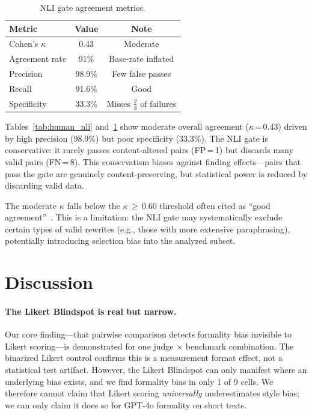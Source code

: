 \documentclass[11pt,a4paper]{article}
\begin{document}
\begin{table}[t]
\centering
\small
\caption{NLI gate agreement metrics.}
\label{tab:nli_metrics}
\begin{tabular}{lcc}
\toprule
\textbf{Metric} & \textbf{Value} & \textbf{Note} \\
\midrule
Cohen's $\kappa$ & 0.43 & Moderate \\
Agreement rate & 91\% & Base-rate inflated \\
Precision & 98.9\% & Few false passes \\
Recall & 91.6\% & Good \\
Specificity & 33.3\% & Misses $\frac{2}{3}$ of failures \\
\bottomrule
\end{tabular}
\end{table}

Tables~\ref{tab:human_nli} and~\ref{tab:nli_metrics} show moderate overall agreement ($\kappa$\,=\,0.43) driven by high precision (98.9\%) but poor specificity (33.3\%).
The NLI gate is conservative: it rarely passes content-altered pairs (FP\,=\,1) but discards many valid pairs (FN\,=\,8).
This conservatism biases against finding effects---pairs that pass the gate are genuinely content-preserving, but statistical power is reduced by discarding valid data.

The moderate $\kappa$ falls below the $\kappa$\,$\geq$\,0.60 threshold often cited as ``good agreement''~\cite{landis1977}.
This is a limitation: the NLI gate may systematically exclude certain types of valid rewrites (e.g., those with more extensive paraphrasing), potentially introducing selection bias into the analyzed subset.

\section{Discussion}

\paragraph{The Likert Blindspot is real but narrow.}
Our core finding---that pairwise comparison detects formality bias invisible to Likert scoring---is demonstrated for one judge $\times$ benchmark combination.
The binarized Likert control confirms this is a measurement format effect, not a statistical test artifact.
However, the Likert Blindspot can only manifest where an underlying bias exists, and we find formality bias in only 1 of 9 cells.
We therefore cannot claim that Likert scoring \textit{universally} underestimates style bias; we can only claim it does so for GPT-4o formality on short texts.
\end{document}
